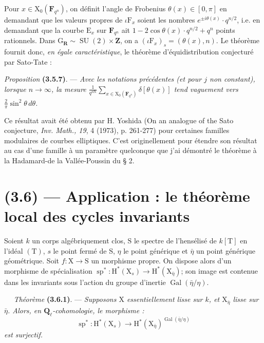 \documentclass[11pt,leqno]{article}
\newcommand{\Page}[1]{\ifvmode\noindent\else\unskip\ \fi{\footnotesize\textcolor{gray}{[p.\,#1]}}\ \ignorespaces}
\begin{document}
Pour \(x\in\mathrm X_0(\mathbf F_{q^n})\), on définit l’angle de Frobenius \(\theta(x)\in[0,\pi]\) en demandant que les valeurs propres de \(\iota\mathrm F_x\) soient les nombres \(e^{\pm i\theta(x)}\cdot q^{n/2}\), i.e. en demandant que la courbe \(\mathrm E_x\) sur \(\mathbf F_{q^n}\) ait \(1-2\cos\theta(x)\cdot q^{n/2}+q^n\) points rationnels. Dans \(\mathrm G_{\mathbf R}\sim\operatorname{SU}(2)\times\mathbf Z\), on a \((\iota\mathrm F_x)_s=(\theta(x),n)\). Le théorème fournit donc, \textit{en égale caractéristique}, le théorème d’équidistribution conjecturé par Sato-Tate :

\textit{Proposition} \textbf{(3.5.7)}. — \textit{Avec les notations précédentes (et pour \(j\) non constant), lorsque \(n\to\infty\), la mesure \(\displaystyle\frac{1}{q^{n\mathrm N}}\sum_{x\in\mathrm X_0(\mathbf F_{q^n})}\delta[\theta(x)]\) tend vaguement vers \(\displaystyle\frac{2}{\pi}\sin^2\theta\,d\theta\).}

Ce résultat avait été obtenu par H. Yoshida (On an analogue of the Sato conjecture, \textit{Inv. Math., 19}, 4 (1973), p. 261-277) pour certaines familles modulaires de courbes elliptiques. C’est originellement pour étendre son résultat au cas d’une famille à un paramètre quelconque que j’ai démontré le théorème à la Hadamard-de la Vallée-Poussin du § 2.

\section*{(3.6) — Application : le théorème local des cycles invariants}

Soient \(k\) un corps algébriquement clos, \(\mathrm S\) le spectre de l’hensélisé de \(k[\mathrm T]\) en l’idéal \((\mathrm T)\), \(s\) le point fermé de \(\mathrm S\), \(\eta\) le point générique et \(\bar\eta\) un point générique géométrique. Soit \(f:\mathrm X\to\mathrm S\) un morphisme propre. On dispose alors d’un morphisme de spécialisation \(\operatorname{sp}^*:\mathrm H^*(\mathrm X_s)\to\mathrm H^*(\mathrm X_{\bar\eta})\); son image est contenue dans les invariants sous l’action du groupe d’inertie \(\operatorname{Gal}(\bar\eta/\eta)\).

\Page{213}
\textit{Théorème} \textbf{(3.6.1)}. — \textit{Supposons \(\mathrm X\) essentiellement lisse sur \(k\), et \(\mathrm X_{\bar\eta}\) lisse sur \(\bar\eta\). Alors, en \(\mathbf Q_\ell\)-cohomologie, le morphisme :}
\[
\operatorname{sp}^*:\mathrm H^*(\mathrm X_s)\to
\mathrm H^*(\mathrm X_{\bar\eta})^{\operatorname{Gal}(\bar\eta/\eta)}
\]
\textit{est surjectif.}
\end{document}
